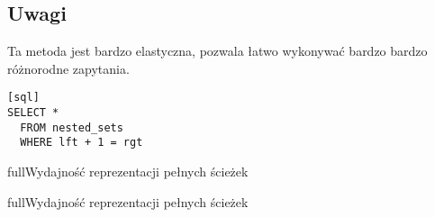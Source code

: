 \subsection{Uwagi}

Ta metoda jest bardzo elastyczna, pozwala łatwo wykonywać bardzo bardzo różnorodne zapytania.



\begin{verbatim}[sql]
SELECT *
  FROM nested_sets
  WHERE lft + 1 = rgt
\end{verbatim}



\begin{qxtab}{full}{Wydajność reprezentacji pełnych ścieżek}
\end{qxtab}

\begin{qxfig}{full}{Wydajność reprezentacji pełnych ścieżek}
\end{qxfig}







